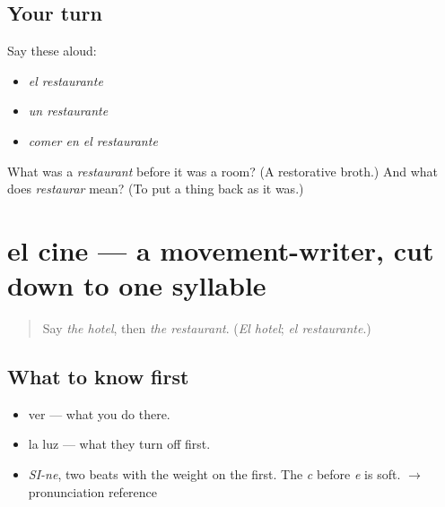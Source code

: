 \subsection*{Your turn}
Say these aloud:

\begin{itemize}
\raggedright
  \item \emph{el restaurante}
  \item \emph{un restaurante}
  \item \emph{comer en el restaurante}
\end{itemize}

\begin{tcolorbox}[breakable,colback=teal!4,colframe=teal!35!black,title={Before you move on}]
What was a \emph{restaurant} before it was a room? (A restorative broth.) And what does \emph{restaurar} mean? (To put a thing back as it was.)
\end{tcolorbox}
\section[el cine]{el cine — a movement-writer, cut down to one syllable}

\label{lesson:ES-C354-cine}



\begin{quote}
Say \emph{the hotel}, then \emph{the restaurant}. (\emph{El hotel}; \emph{el restaurante}.)
\end{quote}

\subsection*{What to know first}
\begin{itemize}
\raggedright
  \item ver — what you do there.
  \item la luz — what they turn off first.
\end{itemize}

\begin{sounds}
\begin{itemize}
\raggedright
  \item \emph{SI-ne}, two beats with the weight on the first. The \emph{c} before \emph{e} is soft. $\to$ pronunciation reference
\end{itemize}
\end{sounds}

